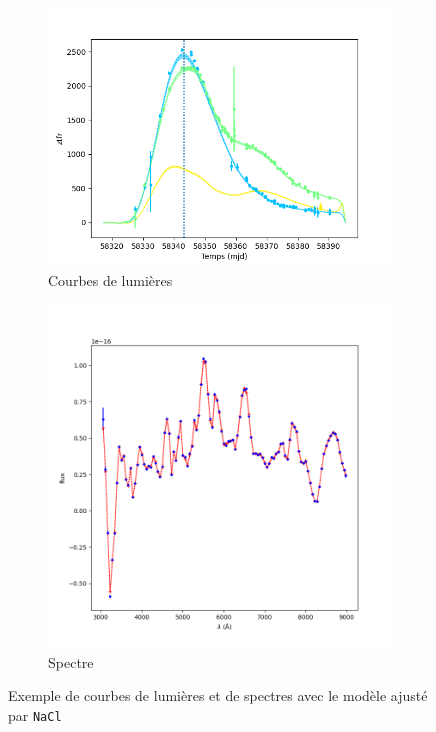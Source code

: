 \documentclass{book}
\def\nacl{\texttt{NaCl}\xspace}
\begin{document}
\begin{figure}[h]
	\centering
	\begin{subfigure}{0.45\textwidth}
		\centering
		\includegraphics[width=\textwidth]{figures/nacl_lc.png}
		\caption{Courbes de lumières}
		\label{fig:nacl_lc}
	\end{subfigure}
	\hfill
	\begin{subfigure}{0.45\textwidth}
		\centering
		\includegraphics[width=\textwidth]{figures/nacl_spec.png}
		\caption{Spectre}
		\label{fig:nacl_sp}
	\end{subfigure}
	\caption{Exemple de courbes de lumières et de spectres avec le modèle ajusté par \nacl}
	\label{fig:nacl_lcsp}
\end{figure}
\end{document}
